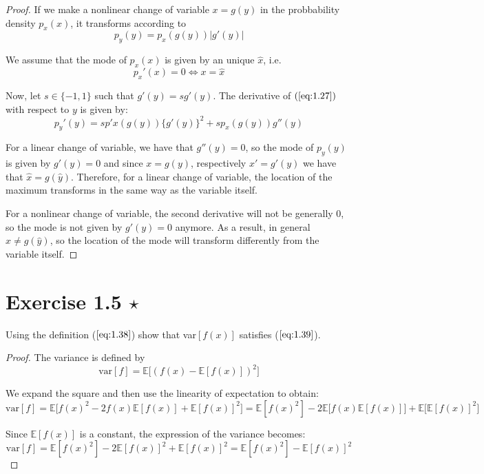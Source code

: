 \vspace{1em}

\begin{proof}
    If we make a nonlinear change of variable $x = g(y)$ in the probbability density 
    $p_x(x)$, it transforms according to
    \begin{equation}\label{eq:1.27}\tag{1.27}
        p_y(y) = p_x(g(y)) |g'(y)|
    \end{equation}

    We assume that the mode of $p_x(x)$ is given by an unique $\widehat{x}$, i.e.
     \[
         p_x'(x) = 0 \iff x = \widehat{x}
    \] 

    Now, let $s \in \{-1, 1\}$ such that $g'(y) = sg'(y)$. 
    The derivative of  $(\ref{eq:1.27})$ with respect to $y$ is given by:
    \[
        p_y'(y) = sp'x(g(y))\{g'(y)\}^2 + sp_x(g(y))g''(y)
    \] 

    For a linear change of variable, we have that $g''(y) = 0$, so the mode of $p_y(y)$ 
    is given by $g'(y) = 0$ and since $x = g(y)$, respectively $x' = g'(y)$ we have that
    $\widehat{x} = g(\widehat{y})$. Therefore, for a linear change of variable, the location
    of the maximum transforms in the same way as the variable itself.

    For a nonlinear change of variable, the second derivative will not be generally 0, so
    the mode is not given by $g'(y) = 0$ anymore. As a result, in general $\widehat{x} \neq g(\widehat{y})$,
    so the location of the mode will transform differently from the variable itself.
\end{proof}

\section*{Exercise 1.5 $\star$}
Using the definition ($\ref{eq:1.38}$) show that var$[f(x)]$ satisfies ($\ref{eq:1.39}$).

\vspace{1em}

\begin{proof}
    The variance is defined by 
    \begin{equation}\label{eq:1.38}\tag{1.38}
        \text{var}[f] = \mathbb{E}\big[(f(x) - \mathbb{E}[f(x)])^2\big]
    \end{equation}

    We expand the square and then use the linearity of expectation to obtain:
    \[
        \text{var}[f] 
        = \mathbb{E}\big[f(x)^2 - 2f(x)\mathbb{E}[f(x)] + \mathbb{E}[f(x)]^2\big]
        = \mathbb{E}[f(x)^2] - 2\mathbb{E}\big[f(x)\mathbb{E}[f(x)]\big] + \mathbb{E}\big[\mathbb{E}[f(x)]^2\big]
    \] 

    Since $\mathbb{E}[f(x)]$ is a constant, the expression of the variance becomes:
    \begin{equation}\label{eq:1.39}\tag{1.39}
        \text{var}[f] 
        = \mathbb{E}[f(x)^2] - 2\mathbb{E}[f(x)]^2 + \mathbb{E}[f(x)]^2
        = \mathbb{E}[f(x)^2] - \mathbb{E}[f(x)]^2
    \end{equation}
\end{proof}

